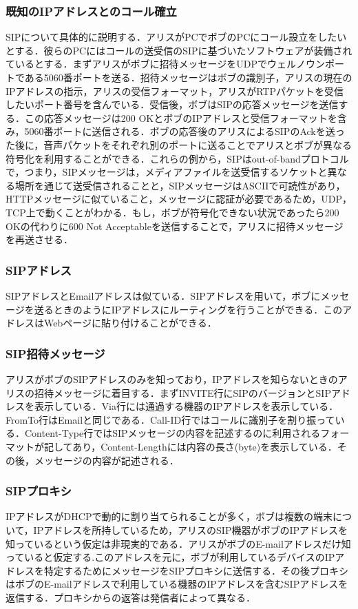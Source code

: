 \subsubsection{既知のIPアドレスとのコール確立}
SIPについて具体的に説明する．アリスがPCでボブのPCにコール設立をしたいとする．彼らのPCにはコールの送受信のSIPに基づいたソフトウェアが装備されているとする．まずアリスがボブに招待メッセージをUDPでウェルノウンポートである5060番ポートを送る．招待メッセージはボブの識別子，アリスの現在のIPアドレスの指示，アリスの受信フォーマット，アリスがRTPパケットを受信したいポート番号を含んでいる．受信後，ボブはSIPの応答メッセージを送信する．この応答メッセージは200 OKとボブのIPアドレスと受信フォーマットを含み，5060番ポートに送信される．ボブの応答後のアリスによるSIPのAckを送った後に，音声パケットをそれぞれ別のポートに送ることでアリスとボブが異なる符号化を利用することができる．これらの例から，SIPはout-of-bandプロトコルで，つまり，SIPメッセージは，メディアファイルを送受信するソケットと異なる場所を通じて送受信されることと，SIPメッセージはASCIIで可読性があり，HTTPメッセージに似ていること，メッセージに認証が必要であるため，UDP，TCP上で動くことがわかる．もし，ボブが符号化できない状況であったら200 OKの代わりに600 Not Acceptableを送信することで，アリスに招待メッセージを再送させる．

\subsubsection{SIPアドレス}
SIPアドレスとEmailアドレスは似ている．SIPアドレスを用いて，ボブにメッセージを送るときのようにIPアドレスにルーティングを行うことができる．このアドレスはWebページに貼り付けることができる．

\subsubsection{SIP招待メッセージ}
アリスがボブのSIPアドレスのみを知っており，IPアドレスを知らないときのアリスの招待メッセージに着目する．まずINVITE行にSIPのバージョンとSIPアドレスを表示している．Via行には通過する機器のIPアドレスを表示している．FromTo行はEmailと同じである．Call-ID行ではコールに識別子を割り振っている．Content-Type行ではSIPメッセージの内容を記述するのに利用されるフォーマットが記してあり，Content-Lengthには内容の長さ(byte)を表示している．その後，メッセージの内容が記述される．

\subsubsection{SIPプロキシ}
IPアドレスがDHCPで動的に割り当てられることが多く，ボブは複数の端末について，IPアドレスを所持しているため，アリスのSIP機器がボブのIPアドレスを知っているという仮定は非現実的である．アリスがボブのE-mailアドレスだけ知っていると仮定する.このアドレスを元に，ボブが利用しているデバイスのIPアドレスを特定するためにメッセージをSIPプロキシに送信する．その後プロキシはボブのE-mailアドレスで利用している機器のIPアドレスを含むSIPアドレスを返信する．プロキシからの返答は発信者によって異なる．


